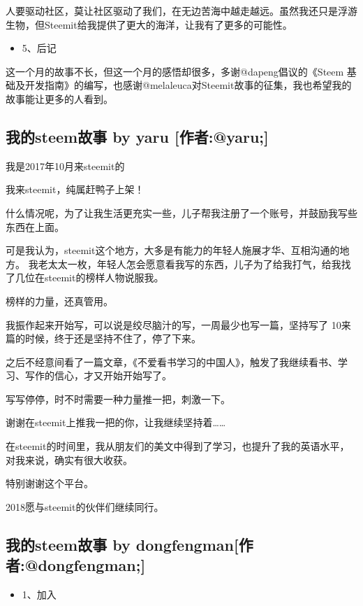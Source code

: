 \documentclass[]{ctexbook}
\providecommand{\tightlist}{%
  \setlength{\itemsep}{0pt}\setlength{\parskip}{0pt}}
\begin{document}
人要驱动社区，莫让社区驱动了我们，在无边苦海中越走越远。虽然我还只是浮游生物，但Steemit给我提供了更大的海洋，让我有了更多的可能性。

\begin{itemize}
\tightlist
\item
  5、后记
\end{itemize}

这一个月的故事不长，但这一个月的感悟却很多，多谢@dapeng倡议的《Steem 基础及开发指南》的编写，也感谢@melaleuca对Steemit故事的征集，我也希望我的故事能让更多的人看到。

\hypertarget{steem-by-yaru-yaru}{%
\subsection{我的steem故事 by yaru {[}作者:@yaru;{]}}\label{steem-by-yaru-yaru}}

我是2017年10月来steemit的

我来steemit，纯属赶鸭子上架！

什么情况呢，为了让我生活更充实一些，儿子帮我注册了一个账号，并鼓励我写些东西在上面。

可是我认为，steemit这个地方，大多是有能力的年轻人施展才华、互相沟通的地方。
我老太太一枚，年轻人怎会愿意看我写的东西，儿子为了给我打气，给我找了几位在steemit的榜样人物说服我。

榜样的力量，还真管用。

我振作起来开始写，可以说是绞尽脑汁的写，一周最少也写一篇，坚持写了 10来篇的时候，终于还是坚持不住了，停了下来。

之后不经意间看了一篇文章，《不爱看书学习的中国人》，触发了我继续看书、学习、写作的信心，才又开始开始写了。

写写停停，时不时需要一种力量推一把，刺激一下。

谢谢在steemit上推我一把的你，让我继续坚持着\ldots{}\ldots{}

在steemit的时间里，我从朋友们的美文中得到了学习，也提升了我的英语水平，对我来说，确实有很大收获。

特别谢谢这个平台。

2018愿与steemit的伙伴们继续同行。

\hypertarget{steem-by-dongfengmandongfengman}{%
\subsection{我的steem故事 by dongfengman{[}作者:@dongfengman;{]}}\label{steem-by-dongfengmandongfengman}}

\begin{itemize}
\tightlist
\item
  1、加入
\end{itemize}
\end{document}
